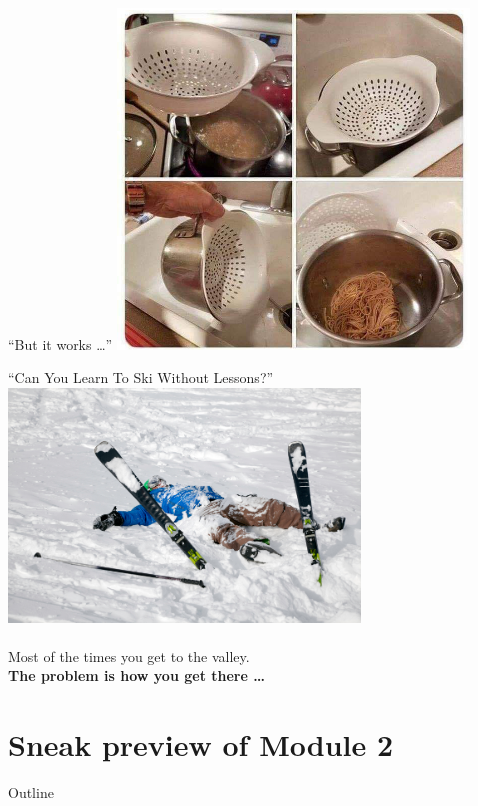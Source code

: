 \documentclass{beamer}%
\begin{document}
\begin{frame}{``But it works \ldots''}
	\centering 
	\includegraphics[width=0.7\textwidth]{figures/itDoesTheJob.jpg}
\end{frame}

\begin{frame}{``Can You Learn To Ski Without Lessons?''}
	\centering 
	\includegraphics[width=0.7\textwidth]{figures/f737c96e-beginner-skier.jpg}
	\\
	{\scriptsize{}}
	\\
	\vspace{0.2cm}
	Most of the times you get to the valley. 
	\\
	\textbf{The problem is how you get there \ldots}
\end{frame}


\section{Sneak preview of Module 2}
\begin{frame}{Outline}
	\tableofcontents[currentsection]
\end{frame}
\end{document}
